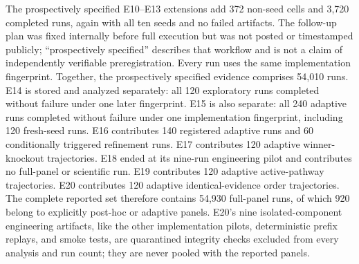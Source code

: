 \documentclass[11pt,a4paper]{article}
\begin{document}
The prospectively specified E10--E13 extensions add 372 non-seed cells and 3,720 completed runs, again with all ten seeds and no failed artifacts. The follow-up plan was fixed internally before full execution but was not posted or timestamped publicly; ``prospectively specified'' describes that workflow and is not a claim of independently verifiable preregistration. Every run uses the same implementation fingerprint. Together, the prospectively specified evidence comprises 54,010 runs. E14 is stored and analyzed separately: all 120 exploratory runs completed without failure under one later fingerprint. E15 is also separate: all 240 adaptive runs completed without failure under one implementation fingerprint, including 120 fresh-seed runs. E16 contributes 140 registered adaptive runs and 60 conditionally triggered refinement runs. E17 contributes 120 adaptive winner-knockout trajectories. E18 ended at its nine-run engineering pilot and contributes no full-panel or scientific run. E19 contributes 120 adaptive active-pathway trajectories. E20 contributes 120 adaptive identical-evidence order trajectories. The complete reported set therefore contains 54,930 full-panel runs, of which 920 belong to explicitly post-hoc or adaptive panels. E20's nine isolated-component engineering artifacts, like the other implementation pilots, deterministic prefix replays, and smoke tests, are quarantined integrity checks excluded from every analysis and run count; they are never pooled with the reported panels.
\end{document}
